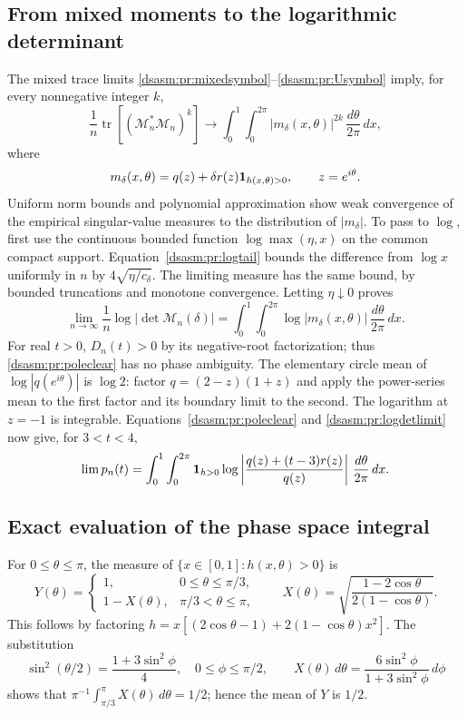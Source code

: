 \documentclass[11pt,letterpaper]{article}
\theoremstyle{remark}\newtheorem{remark}[theorem]{Remark}
\DeclareMathOperator{\tr}{tr}\DeclareMathOperator{\Ran}{Ran}
\begin{document}
\subsection{From mixed moments to the logarithmic determinant}
The mixed trace limits \eqref{dsasm:pr:mixedsymbol}--\eqref{dsasm:pr:Usymbol} imply,
for every nonnegative integer $k$,
\begin{equation}\label{dsasm:pr:singularmoments}
 \frac1n\tr[(\mathcal M_n^*\mathcal M_n)^k]
 \longrightarrow\int_0^1\int_0^{2\pi}
 |m_\delta(x,\theta)|^{2k}\,\frac{d\theta}{2\pi}\,dx,
\end{equation}
where
\[
 m_\delta(x,\theta)=q(z)+\delta r(z)\mathbf1_{h(x,\theta)>0},
 \qquad z=e^{i\theta}.
\]
Uniform norm bounds and polynomial approximation show weak convergence
of the empirical singular-value measures to the distribution of
$|m_\delta|$. To pass to $\log$, first use the continuous bounded
function $\log\max(\eta,x)$ on the common compact support.
Equation~\eqref{dsasm:pr:logtail} bounds the difference from $\log x$ uniformly
in $n$ by $4\sqrt{\eta/c_\delta}$. The limiting measure has the
same bound, by bounded truncations and monotone convergence. Letting
$\eta\downarrow0$ proves
\begin{equation}\label{dsasm:pr:logdetlimit}
 \lim_{n\to\infty}\frac1n\log|\det\mathcal M_n(\delta)|
 =\int_0^1\int_0^{2\pi}\log|m_\delta(x,\theta)|
                      \,\frac{d\theta}{2\pi}\,dx.
\end{equation}
For real $t>0$, $D_n(t)>0$ by its negative-root factorization; thus
\eqref{dsasm:pr:poleclear} has no phase ambiguity. The elementary circle mean
of $\log|q(e^{i\theta})|$ is $\log2$: factor $q=(2-z)(1+z)$ and
apply the power-series mean to the first factor and its boundary
limit to the second. The logarithm at $z=-1$ is integrable.
Equations~\eqref{dsasm:pr:poleclear} and \eqref{dsasm:pr:logdetlimit} now give, for
$3<t<4$,
\begin{equation}\label{dsasm:pr:pressureintegral}
 \lim p_n(t)=\int_0^1\int_0^{2\pi}
 \mathbf1_{h>0}\log\left|\frac{q(z)+(t-3)r(z)}{q(z)}\right|
 \,\frac{d\theta}{2\pi}\,dx.
\end{equation}

\subsection{Exact evaluation of the phase space integral}
For $0\le\theta\le\pi$, the measure of $\{x\in[0,1]:h(x,\theta)>0\}$
is
\[
 Y(\theta)=
 \begin{cases}1,&0\le\theta\le\pi/3,\\
 1-X(\theta),&\pi/3<\theta\le\pi,
 \end{cases}
 \qquad X(\theta)=\sqrt{\frac{1-2\cos\theta}{2(1-\cos\theta)}}.
\]
This follows by factoring
$h=x[(2\cos\theta-1)+2(1-\cos\theta)x^2]$.
The substitution
\begin{equation}\label{dsasm:pr:phisub}
 \sin^2(\theta/2)=\frac{1+3\sin^2\phi}{4},
 \quad 0\le\phi\le\pi/2,
 \qquad
 X(\theta)\,d\theta=\frac{6\sin^2\phi}{1+3\sin^2\phi}\,d\phi
\end{equation}
shows that $\pi^{-1}\int_{\pi/3}^{\pi}X(\theta)\,d\theta=1/2$;
hence the mean of $Y$ is $1/2$.
\end{document}

